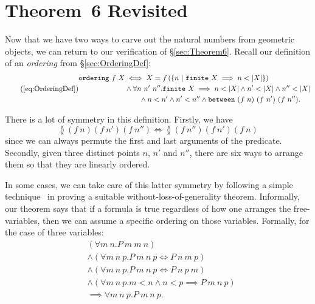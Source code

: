 \section{Theorem~6 Revisited}
Now that we have two ways to carve out the natural numbers from geometric objects, we can return to our verification of \S\ref{sec:Theorem6}. Recall our definition of an \emph{ordering} from \S\ref{sec:OrderingDef}:
\begin{equation}
  \tag{\ref{eq:OrderingDef}}
  \begin{split}
    \code{ordering}\ f\ X &\iff X = f\left(\left\{n\ \vert\ \code{finite}\ X \implies n < \left|X\right|\right\}\right)\\
    &\wedge \forall n\ n'\ n''. \code{finite}\ X \implies n < \left|X\right| \wedge n' < \left|X\right| \wedge n'' < \left|X\right|\\
    &\qquad\wedge n < n' \wedge n' < n'' \wedge \between{(f\ n)}{(f\ n')}{(f\ n'')}.
    \end{split}
\end{equation}

There is a lot of symmetry in this definition. Firstly, we have
\begin{displaymath}
\between{(f\ n)}{(f\ n')}{(f\ n'')} \iff \between{(f\ n'')}{(f\ n')}{(f\ n)}
\end{displaymath}
since we can always permute the first and last arguments of the  predicate. Secondly, given three distinct points $n$, $n'$ and $n''$, there are six ways to arrange them so that they are linearly ordered.

In some cases, we can take care of this latter symmetry by following a simple technique~\cite{HarrisonWLOG} in proving a suitable  without-loss-of-generality theorem. Informally, our theorem says that if a formula is true regardless of how one arranges the free-variables, then we can assume a specific ordering on those variables. Formally, for the case of three variables:
\begin{displaymath}
  \begin{split}
    &(\forall m\ n. P\ m\ m\ n)\\
    &\wedge \left(\forall m\ n\ p. P\ m\ n\ p \iff P\ n\ m\ p\right)\\
    &\wedge \left(\forall m\ n\ p. P\ m\ n\ p \iff P\ n\ p\ m\right)\\
    &\wedge (\forall m\ n\ p. m < n \wedge n < p \implies P\ m\ n\ p)\\
    &\implies \forall m\ n\ p. P\ m\ n\ p.
  \end{split}
\end{displaymath}

